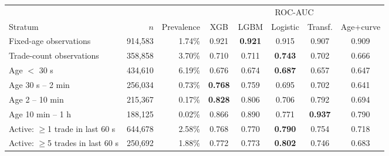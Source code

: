 \begin{tabular}{lrrccccc}
\toprule
 & & & \multicolumn{5}{c}{ROC-AUC} \\
\cmidrule(lr){4-8}
Stratum & $n$ & Prevalence & XGB & LGBM & Logistic & Transf. & Age+curve \\
\midrule
Fixed-age observations & 914{,}583 & 1.74\% & 0.921 & \textbf{0.921} & 0.915 & 0.907 & 0.909 \\
Trade-count observations & 358{,}858 & 3.70\% & 0.710 & 0.711 & \textbf{0.743} & 0.702 & 0.666 \\
Age $<$ 30 s & 434{,}610 & 6.19\% & 0.676 & 0.674 & \textbf{0.687} & 0.657 & 0.647 \\
Age 30 s -- 2 min & 256{,}034 & 0.73\% & \textbf{0.768} & 0.759 & 0.695 & 0.702 & 0.641 \\
Age 2 -- 10 min & 215{,}367 & 0.17\% & \textbf{0.828} & 0.806 & 0.706 & 0.792 & 0.694 \\
Age 10 min -- 1 h & 188{,}125 & 0.02\% & 0.866 & 0.890 & 0.771 & \textbf{0.937} & 0.790 \\
Active: $\geq$1 trade in last 60 s & 644{,}678 & 2.58\% & 0.768 & 0.770 & \textbf{0.790} & 0.754 & 0.718 \\
Active: $\geq$5 trades in last 60 s & 250{,}692 & 1.88\% & 0.772 & 0.773 & \textbf{0.802} & 0.746 & 0.683 \\
\bottomrule
\end{tabular}
